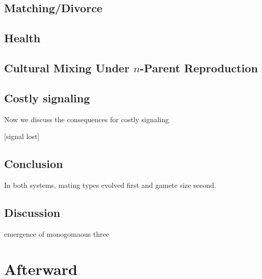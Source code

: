 \documentclass{report}
\begin{document}
\section{Matching/Divorce}


\section{Health}


\section{Cultural Mixing Under $n$-Parent Reproduction}


\section{Costly signaling}
Now we discuss the consequences for costly signaling 

[signal lost]

\section{Conclusion} 
In both systems, mating types evolved first and gamete size second. 

\section{Discussion} 
emergence of monogomaous three 



\chapter{Afterward}



{}


\clearpage
\end{document}
